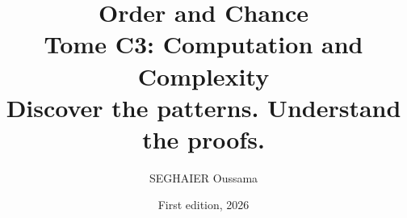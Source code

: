 \documentclass[11pt,openany]{book}
\title{\Huge\textbf{Order and Chance}\\[0.4em]\LARGE Tome C3: Computation and Complexity\\[0.6em]
\Large Discover the patterns. Understand the proofs.}
\author{SEGHAIER Oussama}
\date{First edition, 2026}
\begin{document}
\frontmatter
\makecover
\maketitle

\tableofcontents

\mainmatter













\end{document}
